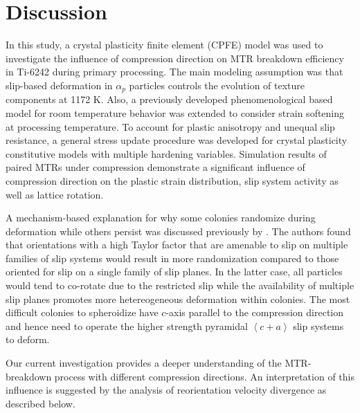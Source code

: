 \documentclass[review]{elsarticle}
\begin{document}
\section{Discussion}
\label{discussion}
In this study, a crystal plasticity finite element (CPFE) model was used to investigate the influence of compression direction on MTR breakdown efficiency in Ti-6242 during primary processing.
The main modeling assumption was that slip-based deformation in $\alpha _p$ particles controls the evolution of texture components at 1172 K.
Also, a previously developed phenomenological based model for room temperature behavior was extended to consider strain softening at processing temperature.
To account for plastic anisotropy and unequal slip resistance, a general stress update procedure was developed for crystal plasticity constitutive models with multiple hardening variables.
Simulation results of paired MTRs under compression demonstrate a significant influence of compression direction on the plastic strain distribution, slip system activity as well as lattice rotation.

A mechanism-based explanation for why some colonies randomize during deformation while others persist was discussed previously by \cite{r13}.
The authors found that orientations with a high Taylor factor that are amenable to slip on multiple families of slip systems would result in more randomization compared to those oriented for slip on a single family of slip planes.
In the latter case, all particles would tend to co-rotate due to the restricted slip while the availability of multiple slip planes promotes more hetereogeneous deformation within colonies.
The most difficult colonies to spheroidize have $c$-axis parallel to the compression direction and hence need to operate the higher strength pyramidal $\left< c+a \right>$ slip systems to deform.

Our current investigation provides a deeper understanding of the MTR-breakdown process with different compression directions.
An interpretation of this influence is suggested by the analysis of reorientation velocity divergence as described below.
\end{document}
